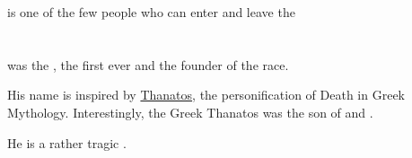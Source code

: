 \Najarod{} is one of the few people who can enter and leave the 















\section[Thanatzil]{\Thanatzil}
\index{\Thanatzil}
\Thanatzil{} was the \banemessiah, the first \resphan{} ever and the founder of the \resphan{} race. 

His name is inspired by \href{http://en.wikipedia.org/wiki/Thanatos}{Thanatos}, the personification of Death in Greek Mythology. Interestingly, the Greek Thanatos was the son of \Erebos{} and \Nyx. 

He is a rather tragic . 

